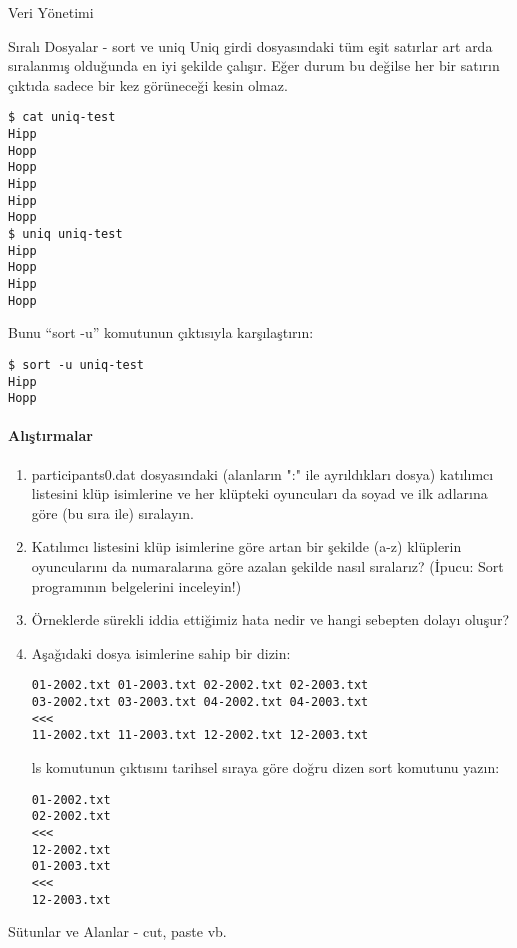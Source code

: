 \begin{section}{Veri Yönetimi}
\begin{subsection}{Sıralı Dosyalar - sort ve uniq}
Uniq girdi dosyasındaki tüm eşit satırlar art arda sıralanmış olduğunda en iyi şekilde çalışır. Eğer durum bu değilse her bir satırın çıktıda sadece bir kez görüneceği kesin olmaz.

\footnotesize
\begin{verbatim}
$ cat uniq-test
Hipp
Hopp
Hopp
Hipp
Hipp
Hopp
$ uniq uniq-test
Hipp
Hopp
Hipp
Hopp
\end{verbatim}
\normalsize

Bunu “sort -u” komutunun çıktısıyla karşılaştırın:

\footnotesize
\begin{verbatim}
$ sort -u uniq-test
Hipp
Hopp
\end{verbatim}
\normalsize

\paragraph{{\Huge{\PencilLeftDown}}Alıştırmalar}{
\begin{enumerate}
 \item participants0.dat dosyasındaki (alanların ":" ile ayrıldıkları dosya) katılımcı listesini klüp isimlerine ve her klüpteki oyuncuları da soyad ve ilk adlarına göre (bu sıra ile) sıralayın.
 \item Katılımcı listesini klüp isimlerine göre artan bir şekilde (a-z) klüplerin oyuncularını da numaralarına göre azalan şekilde nasıl sıralarız? (İpucu: Sort programının belgelerini inceleyin!)
 \item Örneklerde sürekli iddia ettiğimiz hata nedir ve hangi sebepten dolayı oluşur?
 \item Aşağıdaki dosya isimlerine sahip bir dizin:
 \footnotesize
 \begin{verbatim}
01-2002.txt 01-2003.txt 02-2002.txt 02-2003.txt
03-2002.txt 03-2003.txt 04-2002.txt 04-2003.txt
<<<
11-2002.txt 11-2003.txt 12-2002.txt 12-2003.txt
 \end{verbatim}
 \normalsize

 ls komutunun çıktısını tarihsel sıraya göre doğru dizen sort komutunu yazın:

 \footnotesize
 \begin{verbatim}
01-2002.txt
02-2002.txt
<<<
12-2002.txt
01-2003.txt
<<<
12-2003.txt
 \end{verbatim}
 \normalsize
\end{enumerate}}

\end{subsection}

\begin{subsection}{Sütunlar ve Alanlar - cut, paste vb.}


\end{subsection}
\end{section}
